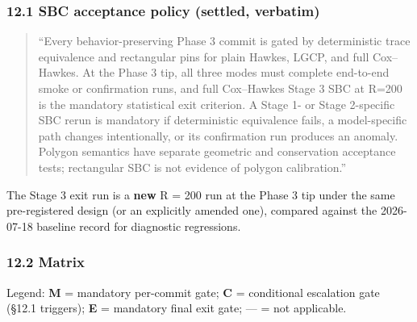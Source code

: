\documentclass[
  10pt,
]{article}
\begin{document}
\hypertarget{sbc-acceptance-policy-settled-verbatim}{%
\subsubsection{12.1 SBC acceptance policy (settled, verbatim)}\label{sbc-acceptance-policy-settled-verbatim}}

\begin{quote}
``Every behavior-preserving Phase 3 commit is gated by deterministic trace equivalence and rectangular pins for plain Hawkes, LGCP, and full Cox--Hawkes. At the Phase 3 tip, all three modes must complete end-to-end smoke or confirmation runs, and full Cox--Hawkes Stage 3 SBC at R=200 is the mandatory statistical exit criterion. A Stage 1- or Stage 2-specific SBC rerun is mandatory if deterministic equivalence fails, a model-specific path changes intentionally, or its confirmation run produces an anomaly. Polygon semantics have separate geometric and conservation acceptance tests; rectangular SBC is not evidence of polygon calibration.''
\end{quote}

The Stage 3 exit run is a \textbf{new} R = 200 run at the Phase 3 tip under the same pre-registered design (or an explicitly amended one), compared against the 2026-07-18 baseline record for diagnostic regressions.

\hypertarget{matrix}{%
\subsubsection{12.2 Matrix}\label{matrix}}

Legend: \textbf{M} = mandatory per-commit gate; \textbf{C} = conditional escalation gate (§12.1 triggers); \textbf{E} = mandatory final exit gate; --- = not applicable.
\end{document}
